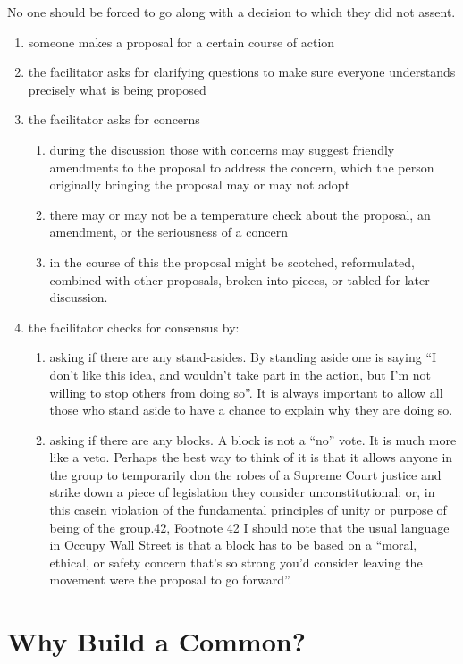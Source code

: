 \documentclass{article}
\begin{document}
No one should be forced to go along with a decision to which they did not assent.
\begin{enumerate}[]
	\item someone makes a proposal for a certain course of action
	\item  the facilitator asks for clarifying questions to make sure everyone understands precisely what is being proposed
	\item the facilitator asks for concerns
	\begin{enumerate}
		\item during the discussion those with concerns may suggest friendly amendments to the proposal to address the concern, which the person originally bringing the proposal may or may not adopt
		\item there may or may not be a temperature check about the proposal, an amendment, or the seriousness of a concern
		\item in the course of this the proposal might be scotched, reformulated, combined with other proposals, broken into pieces, or tabled for later discussion.
	\end{enumerate}
	\item the facilitator checks for consensus by:
	\begin{enumerate}
		\item asking if there are any stand-asides. By standing aside one is saying “I don’t like this idea, and wouldn’t take part in the action, but I’m not willing to stop others from doing so”. It is always important to allow all those who stand aside to have a chance to explain why they are doing so.
		\item asking if there are any blocks. A block is not a “no” vote. It is much more like a veto. Perhaps the best way to think of it is that it allows anyone in the group to temporarily don the robes of a Supreme Court justice and strike down a piece of legislation they consider unconstitutional; or, in this casein violation of the fundamental principles of unity or purpose of being of the group.{42},
		Footnote {42} I should note that the usual language in Occupy Wall Street is that a block has to be based on a “moral, ethical, or safety concern that’s so strong you’d consider leaving the movement were the proposal to go forward”.
	\end{enumerate}
\end{enumerate}

\pagebreak
\section{Why Build a Common?}
\end{document}
